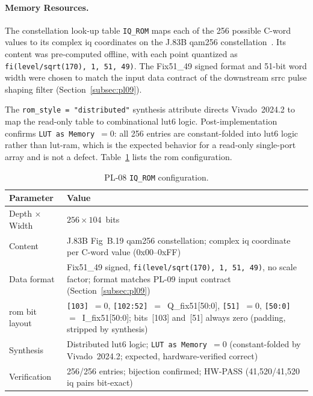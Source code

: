 
\FloatBarrier
\paragraph{Memory Resources.}

The constellation look-up table \texttt{IQ\_ROM} maps each of the 256
possible C-word values to its complex \ac{iq} coordinates on the
J.83B \ac{qam256} constellation~\cite{ITU_J83}.
Its content was pre-computed offline, with each point quantized as
\texttt{fi(level/sqrt(170), 1, 51, 49)}.
The Fix51\_49 signed format and 51-bit word width were chosen to
match the input data contract of the downstream \ac{srrc} pulse shaping
filter (Section~\ref{subsec:pl09}).

The \texttt{rom\_style = "distributed"} synthesis attribute directs
Vivado~2024.2 to map the read-only table to combinational \ac{lut6}
logic.
Post-implementation confirms \texttt{LUT as Memory}~$= 0$: all 256
entries are constant-folded into \ac{lut6} logic rather than
\ac{lut}-\ac{ram}, which is the expected behavior for a read-only
single-port array and is not a defect.
Table~\ref{tab:pl08_rom} lists the \ac{rom} configuration.

\begin{table}[htbp]
  \caption{PL-08 \texttt{IQ\_ROM} configuration.}
  \label{tab:pl08_rom}
  \centering
  \small
  \begin{tabular}{p{3.5cm}p{11.0cm}}
    \hline
    Parameter              & Value \\
    \hline
    Depth $\times$ Width   & $256 \times 104$~bits \\[2pt]
    Content                & J.83B Fig~B.19 \ac{qam256} constellation;
                             complex \ac{iq} coordinate per C-word value
                             (0x00--0xFF)~\cite{ITU_J83} \\[2pt]
    Data format            & Fix51\_49 signed, \texttt{fi(level/sqrt(170), 1, 51, 49)},
                             no scale factor; format matches PL-09 input contract
                             (Section~\ref{subsec:pl09}) \\[2pt]
    \ac{rom} bit layout    & \texttt{[103]}~$= 0$, \texttt{[102:52]}~$=$~Q\_fix51[50:0],
                             \texttt{[51]}~$= 0$, \texttt{[50:0]}~$=$~I\_fix51[50:0];
                             bits~[103] and~[51] always zero (padding, stripped by synthesis) \\[2pt]
    Synthesis              & Distributed \ac{lut6} logic;
                             \texttt{LUT as Memory}~$= 0$ (constant-folded by
                             Vivado~2024.2; expected, hardware-verified correct) \\[2pt]
    Verification           & 256/256 entries; bijection confirmed;
                             HW-PASS
                             (41{,}520/41{,}520 \ac{iq} pairs bit-exact) \\
    \hline
  \end{tabular}
\end{table}

